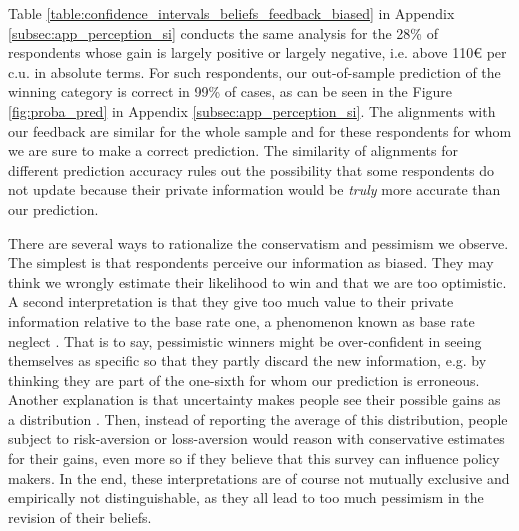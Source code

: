 \documentclass[11pt]{article}
\begin{document}
Table \ref{table:confidence_intervals_beliefs_feedback_biased} in Appendix \ref{subsec:app_perception_si} conducts the same analysis for the 28\% of respondents whose gain is largely positive or largely negative, i.e. above 110\euro{} per c.u. in absolute terms. For such respondents, our out-of-sample prediction of the winning category is correct in 99\% of cases, as can be seen in the Figure \ref{fig:proba_pred} in Appendix \ref{subsec:app_perception_si}. The alignments with our feedback are similar for the whole sample and for these respondents for whom we are sure to make a correct prediction. The similarity of alignments for different prediction accuracy rules out the possibility that some respondents do not update because their private information would be \textit{truly} more accurate than our prediction.

There are several ways to rationalize the conservatism and pessimism we observe. The simplest is that respondents perceive our information as biased. They may think we wrongly estimate their likelihood to win and that we are too optimistic. A second interpretation is that they give too much value to their private information relative to the base rate one, a phenomenon known as base rate neglect \citep{grether_bayes_1980}. That is to say, pessimistic winners might be over-confident in seeing themselves as specific so that they partly discard the new information, e.g. by thinking they are part of the one-sixth for whom our prediction is erroneous. Another explanation is that uncertainty makes people see their possible gains as a distribution \citep[see][]{stiglitz_addressing_2019}. Then, instead of reporting the average of this distribution, people subject to risk-aversion or loss-aversion would reason with conservative estimates for their gains, even more so if they believe that this survey can influence policy makers. In the end, these interpretations are of course not mutually exclusive and empirically not distinguishable, as they all lead to too much pessimism in the revision of their beliefs.

\end{document}
